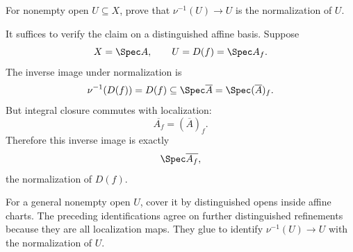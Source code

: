 \begin{problem}\label{prob:vi28-07}
For nonempty open \(U\subseteq X\), prove that \(\nu^{-1}(U)\to U\) is the normalization of \(U\).

\end{problem}

\ifdefined\FullProblemDossiers
\begin{solution}
It suffices to verify the claim on a distinguished affine basis. Suppose
\[
X=\Spec A,\qquad U=D(f)=\Spec A_f.
\]
The inverse image under normalization is
\[
\nu^{-1}(D(f))
=
D(f)\subseteq\Spec\overline A
=
\Spec(\overline A)_f.
\]
But integral closure commutes with localization:
\[
\overline{A_f}=(\overline A)_f.
\]
Therefore this inverse image is exactly
\[
\Spec\overline{A_f},
\]
the normalization of \(D(f)\).

For a general nonempty open \(U\), cover it by distinguished opens inside affine charts. The preceding identifications agree on further distinguished refinements because they are all localization maps. They glue to identify \(\nu^{-1}(U)\to U\) with the normalization of \(U\).
\end{solution}
\fi
